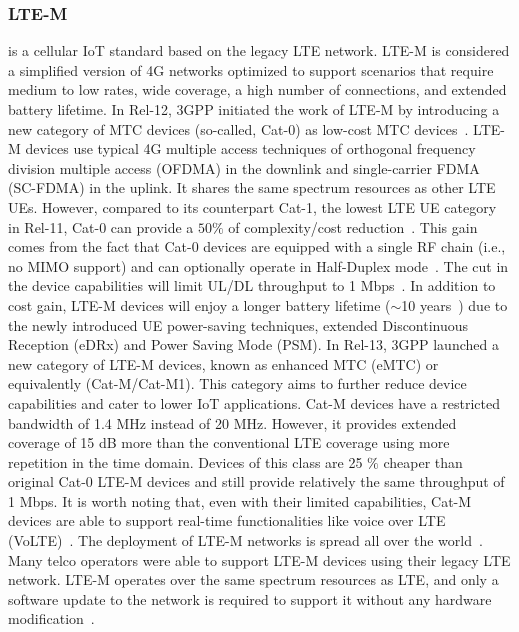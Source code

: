 \documentclass[]{IEEEtran}
\begin{document}
\subsubsection{LTE-M}
\label{sec:2-2-2}
is a cellular IoT standard based on the legacy LTE network.
LTE-M is considered a simplified version of 4G networks optimized to support scenarios that require medium to low rates, wide coverage, a high number of connections, and extended battery lifetime\cite{benhiba_comparative_2018}.
In Rel-12, 3GPP initiated the work of LTE-M by introducing a new category of MTC devices (so-called, Cat-0) as low-cost MTC devices~\cite{rico2016overview}.
LTE-M devices use typical 4G multiple access techniques of orthogonal frequency division multiple access (OFDMA) in the downlink and single-carrier FDMA (SC-FDMA) in the uplink.
It shares the same spectrum resources as other LTE UEs\cite{ding_iot_2020}.
However, compared to its counterpart Cat-1, the lowest LTE UE category in Rel-11, Cat-0 can provide a $50\%$ of complexity/cost reduction~\cite{sharma2019toward}.
This gain comes from the fact that Cat-0 devices are equipped with a single RF chain (i.e., no MIMO support) and can optionally operate in Half-Duplex mode~\cite{liberg_cellular_2019}.
The cut in the device capabilities will limit UL/DL throughput to 1 Mbps~\cite{wang_information_2021}.
In addition to cost gain, LTE-M devices will enjoy a longer battery lifetime ($\sim$10 years~\cite{GSM_white_2018}) due to the newly introduced UE power-saving techniques, extended Discontinuous Reception (eDRx) and Power Saving Mode (PSM)\cite{raza2017low}.
In Rel-13, 3GPP launched a new category of LTE-M devices, known as enhanced MTC (eMTC) or equivalently (Cat-M/Cat-M1).
This category aims to further reduce device capabilities and cater to lower IoT applications.
Cat-M devices have a restricted bandwidth of 1.4 MHz instead of 20 MHz.
However, it provides extended coverage of 15 dB more than the conventional LTE coverage\cite{xu_narrowband_2018_3} using more repetition in the time domain.
Devices of this class are 25 $\%$  cheaper than original Cat-0 LTE-M devices and still provide relatively the same throughput of 1 Mbps\cite{herrero_fundamentals_2021}.
It is worth noting that, even with their limited capabilities, Cat-M devices are able to support real-time functionalities like voice over LTE (VoLTE)~\cite{foubert2020long}.
The deployment of LTE-M networks is spread all over the world~\cite{foubert2020long}.
Many telco operators were able to support LTE-M devices using their legacy LTE network.
LTE-M operates over the same spectrum resources as LTE, and only a software update to the network is required to support it without any hardware modification~\cite{chaudhari2020lpwan}.
\end{document}

